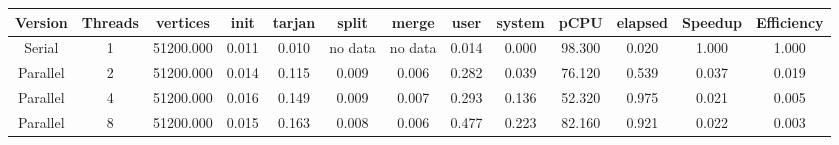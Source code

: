 \begin{tabular}{|c|c|c|c|c|c|c|c|c|c|c|c|c|}
\toprule
 Version &  Threads &  vertices &  init &  tarjan &   split &   merge &  user &  system &   pCPU &  elapsed &  Speedup &  Efficiency \\
\midrule
  Serial &        1 & 51200.000 & 0.011 &   0.010 & no data & no data & 0.014 &   0.000 & 98.300 &    0.020 &    1.000 &       1.000 \\
Parallel &        2 & 51200.000 & 0.014 &   0.115 &   0.009 &   0.006 & 0.282 &   0.039 & 76.120 &    0.539 &    0.037 &       0.019 \\
Parallel &        4 & 51200.000 & 0.016 &   0.149 &   0.009 &   0.007 & 0.293 &   0.136 & 52.320 &    0.975 &    0.021 &       0.005 \\
Parallel &        8 & 51200.000 & 0.015 &   0.163 &   0.008 &   0.006 & 0.477 &   0.223 & 82.160 &    0.921 &    0.022 &       0.003 \\
\bottomrule
\end{tabular}
